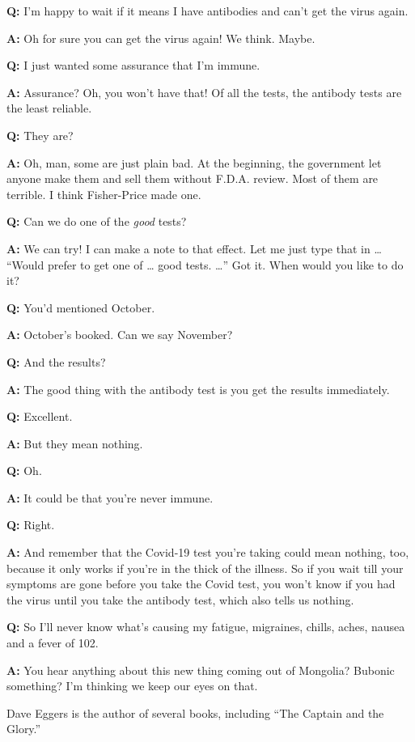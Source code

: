 \textbf{Q:} I'm happy to wait if it means I have antibodies and can't
get the virus again.

\textbf{A:} Oh for sure you can get the virus again! We think. Maybe.

\textbf{Q:} I just wanted some assurance that I'm immune.

\textbf{A:} Assurance? Oh, you won't have that! Of all the tests, the
antibody tests are the least reliable.

\textbf{Q:} They are?

\textbf{A:} Oh, man, some are just plain bad. At the beginning, the
government let anyone make them and sell them without F.D.A. review.
Most of them are terrible. I think Fisher-Price made one.

\textbf{Q:} Can we do one of the \emph{good} tests?

\textbf{A:} We can try! I can make a note to that effect. Let me just
type that in \ldots{} ``Would prefer to get one of \ldots{} good tests.
\ldots'' Got it. When would you like to do it?

\textbf{Q:} You'd mentioned October.

\textbf{A:} October's booked. Can we say November?

\textbf{Q:} And the results?

\textbf{A:} The good thing with the antibody test is you get the results
immediately.

\textbf{Q:} Excellent.

\textbf{A:} But they mean nothing.

\textbf{Q:} Oh.

\textbf{A:} It could be that you're never immune.

\textbf{Q:} Right.

\textbf{A:} And remember that the Covid-19 test you're taking could mean
nothing, too, because it only works if you're in the thick of the
illness. So if you wait till your symptoms are gone before you take the
Covid test, you won't know if you had the virus until you take the
antibody test, which also tells us nothing.

\textbf{Q:} So I'll never know what's causing my fatigue, migraines,
chills, aches, nausea and a fever of 102.

\textbf{A:} You hear anything about this new thing coming out of
Mongolia? Bubonic something? I'm thinking we keep our eyes on that.

Dave Eggers is the author of several books, including ``The Captain and
the Glory.''

